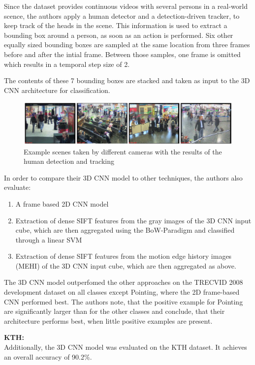 Since the dataset provides continuous videos with several persons in a real-world scence, the authors apply a human detector and a detection-driven tracker, to keep track of the heads in the scene.
This information is used to extract a bounding box around a person, as soon as an action is performed. 
Six other equally sized bounding boxes are sampled at the same location from three frames before and after the intial frame.
Between those samples, one frame is omitted which results in a temporal step size of 2.

The contents of these 7 bounding boxes are stacked and taken as input to the 3D CNN architecture for classification.

\begin{figure}[H]
    \centering
    \includegraphics[width=\textwidth]{img_deep/3dconv_sampletracking}
    \caption{Example scenes taken by different cameras with the results of the human detection and tracking \cite{ji_3d_2013}}
    \label{fig:3dconv_sampletracking}
\end{figure}

In order to compare their 3D CNN model to other techniques, the authors also evaluate:
\begin{enumerate}
    \item A frame based 2D CNN model
    \item Extraction of dense SIFT features from the gray images of the 3D CNN input cube, which are then aggregated using the BoW-Paradigm and classified through a linear SVM
    \item Extraction of dense SIFT features from the motion edge history images (MEHI) of the 3D CNN input cube, which are then aggregated as above.
\end{enumerate}

The 3D CNN model outperfomed the other approaches on the TRECVID 2008 development dataset on all classes except Pointing, where the 2D frame-based CNN performed best.
The authors note, that the positive example for Pointing are significantly larger than for the other classes and conclude, that their architecture performs best, when little positive examples are present.

\textbf{KTH:}\\
Additionally, the 3D CNN model was evaluated on the KTH dataset.
It achieves an overall accuracy of 90.2\%.

